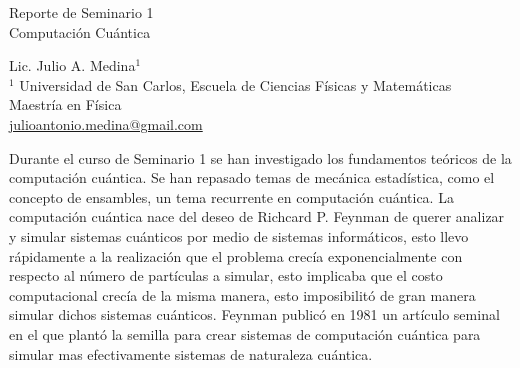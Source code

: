 \documentclass[a4paper]{article}
\begin{document}

\Large
 \begin{center}
Reporte de Seminario 1\\
Computación Cuántica  

\hspace{10pt}

\large
Lic. Julio A. Medina$^1$ \\

\hspace{10pt}
\small  
$^1$ Universidad de San Carlos, Escuela de Ciencias Físicas y Matemáticas\\
Maestría en Física\\
\href{mailto:julioantonio.medina@gmail.com}{julioantonio.medina@gmail.com}\\

\end{center}

\hspace{10pt}

\normalsize
Durante el curso de Seminario 1 se han investigado los fundamentos teóricos de la computación cuántica. Se han repasado temas de mecánica estadística, como el concepto de ensambles, un tema recurrente en computación cuántica. La computación cuántica nace del deseo de Richcard P. Feynman de querer analizar y simular sistemas cuánticos por medio de sistemas informáticos, esto llevo rápidamente a la realización que el problema crecía exponencialmente con respecto al número de partículas a simular, esto implicaba que el costo computacional crecía de la misma manera, esto imposibilitó de gran manera simular dichos sistemas cuánticos. Feynman\cite{Feynman} publicó en 1981 un artículo seminal en el que plantó la semilla para crear sistemas de computación cuántica para simular mas efectivamente sistemas de naturaleza cuántica. \\
\end{document}

